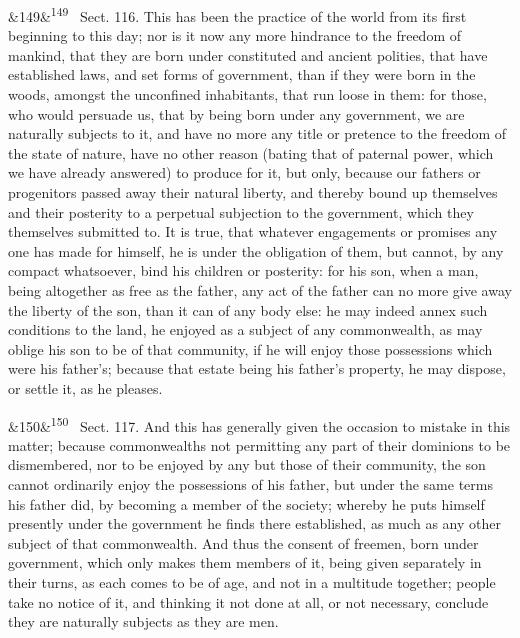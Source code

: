 \documentclass[12pt]{article}
\newcommand{\para}[1][]{\par\noindent\ifx&#1&\else\textsuperscript{\footnotesize #1}~\fi}
\begin{document}
\para[149] Sect. 116. This has been the practice of the world from its first beginning to this day; nor is it now any more hindrance to the freedom of mankind, that they are born under constituted and ancient polities, that have established laws, and set forms of government, than if they were born in the woods, amongst the unconfined inhabitants, that run loose in them: for those, who would persuade us, that by being born under any government, we are naturally subjects to it, and have no more any title or pretence to the freedom of the state of nature, have no other reason (bating that of paternal power, which we have already answered) to produce for it, but only, because our fathers or progenitors passed away their natural liberty, and thereby bound up themselves and their posterity to a perpetual subjection to the government, which they themselves submitted to. It is true, that whatever engagements or promises any one has made for himself, he is under the obligation of them, but cannot, by any compact whatsoever, bind his children or posterity: for his son, when a man, being altogether as free as the father, any act of the father can no more give away the liberty of the son, than it can of any body else: he may indeed annex such conditions to the land, he enjoyed as a subject of any commonwealth, as may oblige his son to be of that community, if he will enjoy those possessions which were his father's; because that estate being his father's property, he may dispose, or settle it, as he pleases.

\para[150] Sect. 117. And this has generally given the occasion to mistake in this matter; because commonwealths not permitting any part of their dominions to be dismembered, nor to be enjoyed by any but those of their community, the son cannot ordinarily enjoy the possessions of his father, but under the same terms his father did, by becoming a member of the society; whereby he puts himself presently under the government he finds there established, as much as any other subject of that commonwealth. And thus the consent of freemen, born under government, which only makes them members of it, being given separately in their turns, as each comes to be of age, and not in a multitude together; people take no notice of it, and thinking it not done at all, or not necessary, conclude they are naturally subjects as they are men.
\end{document}
